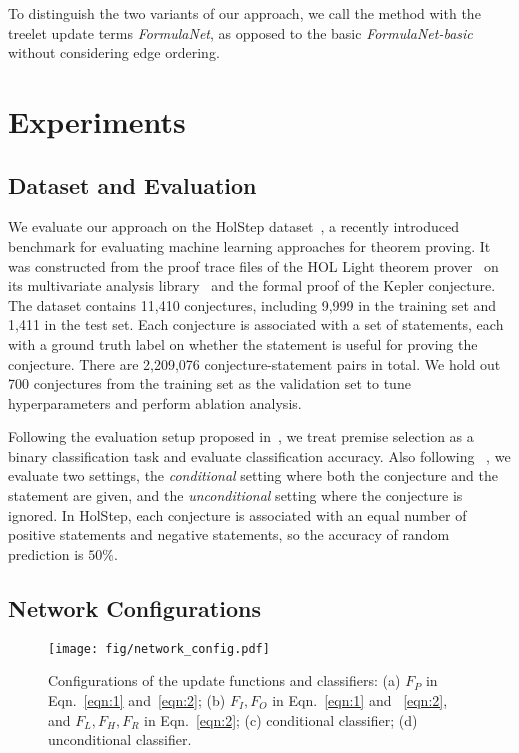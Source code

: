 \documentclass{article}
\begin{document}
To distinguish the two variants of our approach, we call the method with the treelet
update terms \emph{FormulaNet}, as opposed to the basic \emph{FormulaNet-basic}
without considering edge ordering. 

\section{Experiments}

\subsection{Dataset and Evaluation} 
We evaluate our approach on the HolStep dataset~\cite{holstep}, a recently introduced
benchmark for evaluating machine learning approaches for theorem proving. It was
constructed from the proof trace files of the HOL Light theorem prover~\cite{Harrison2009} on its
multivariate analysis library~\cite{harrison2013hol} and the formal proof of the Kepler conjecture. 
The dataset contains 11,410 conjectures, including 9,999 in the training set and 1,411 in
the test set. Each conjecture is associated with a set of statements, each with a ground
truth label on whether the statement is useful for proving the conjecture. There are 2,209,076
conjecture-statement pairs in total. We hold out 700 conjectures from the training set as the validation set to
tune hyperparameters and perform ablation analysis. 

Following the evaluation setup proposed in~\cite{holstep}, we treat premise selection as
a binary classification task and evaluate classification accuracy. Also following ~\cite{holstep},
we evaluate two settings, the \emph{conditional} setting where both the conjecture and the statement are given, and
the \emph{unconditional} setting where the conjecture is ignored. In HolStep, each
conjecture is associated with an equal number of positive statements and 
 negative statements, so the accuracy of random prediction is $50\%$. 

\subsection{Network Configurations}\label{config}

\begin{figure}
	\centering
	\texttt{[image: fig/network\_config.pdf]}
	\caption{Configurations of the update functions and classifiers: (a) $F_P$ in  Eqn.~\ref{eqn:1} and~\ref{eqn:2}; (b) $F_I,
          F_O$ in Eqn.~\ref{eqn:1} and ~\ref{eqn:2}, and $F_L, F_H, F_R$ in  Eqn.~\ref{eqn:2}; (c) conditional classifier; (d) unconditional classifier.}
	\label{fig:network_config}
	\vspace{-4mm}
\end{figure}
\end{document}
